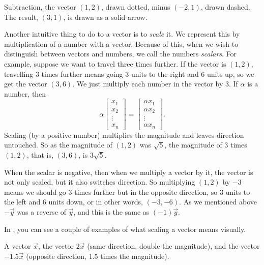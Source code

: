 \begin{myfig}
\capstart
{}
\caption{Subtraction, the vector $(1,2)$, drawn dotted, minus $(-2,1)$,
drawn dashed.  The
result, $(3,1)$, is drawn as a solid arrow.\label{linalg-vecsub:fig}}
\end{myfig}

Another intuitive thing to do to a vector is to
\emph{scale} it.
We represent this by multiplication of a number with a vector.
Because of this, when we wish to distinguish between vectors and numbers, we
call the numbers \emph{scalars}.
For example,
suppose we want to travel three times further.  If the vector is $(1,2)$,
travelling 3 times further means going 3 units to the right and 6 units up,
so we get the vector $(3,6)$.
We just multiply each number in the vector by 3.
If $\alpha$ is a number, then
\begin{equation*}
\alpha
\begin{bmatrix}
x_{1} \\ x_2 \\ \vdots \\ x_n
\end{bmatrix} =
\begin{bmatrix}
\alpha x_{1} \\ \alpha x_2 \\ \vdots \\ \alpha x_n
\end{bmatrix} .
\end{equation*}
Scaling (by a positive number) multiplies the magnitude
and leaves direction untouched.
So as the magnitude of $(1,2)$
was $\sqrt{5}$, the magnitude of 3 times $(1,2)$, that is, $(3,6)$, is
$3\sqrt{5}$.

When the scalar is negative, then when we multiply a vector by it, the
vector is not only scaled, but it also switches direction.
So
multiplying $(1,2)$ by $-3$ means we should go 3 times further but in the
opposite direction, so 3 units to the left and 6 units down, or in other
words, $(-3,-6)$.  As we mentioned above $-\vec{y}$ was a reverse of
$\vec{y}$, and this is the same as $(-1)\vec{y}$.

In , you can see a couple of examples of
what scaling a vector means visually.

\begin{myfig}
\capstart
{}
\caption{A vector $\vec{x}$, the vector $2\vec{x}$ (same direction,
double the magnitude), and the vector $-1.5\vec{x}$ (opposite direction,
1.5 times the magnitude).\label{linalg-vecscale:fig}}
\end{myfig}

